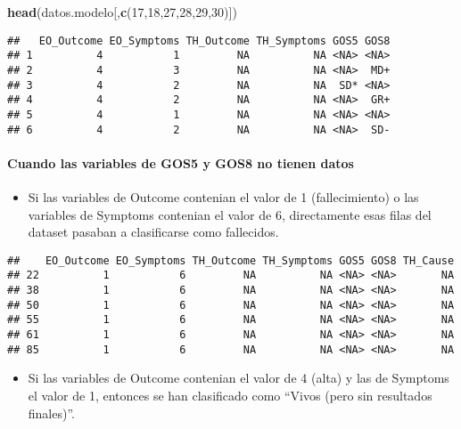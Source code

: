 \documentclass[]{article}
\newenvironment{Shaded}{\begin{snugshade}}{\end{snugshade}}
\newcommand{\KeywordTok}[1]{\textcolor[rgb]{0.13,0.29,0.53}{\textbf{#1}}}
\newcommand{\DecValTok}[1]{\textcolor[rgb]{0.00,0.00,0.81}{#1}}
\newcommand{\NormalTok}[1]{#1}
\providecommand{\tightlist}{%
  \setlength{\itemsep}{0pt}\setlength{\parskip}{0pt}}
\let\oldparagraph\paragraph
\renewcommand{\paragraph}[1]{\oldparagraph{#1}\mbox{}}
\begin{document}
\begin{Shaded}
\begin{Highlighting}[]
\KeywordTok{head}\NormalTok{(datos.modelo[,}\KeywordTok{c}\NormalTok{(}\DecValTok{17}\NormalTok{,}\DecValTok{18}\NormalTok{,}\DecValTok{27}\NormalTok{,}\DecValTok{28}\NormalTok{,}\DecValTok{29}\NormalTok{,}\DecValTok{30}\NormalTok{)])}
\end{Highlighting}
\end{Shaded}

\begin{verbatim}
##   EO_Outcome EO_Symptoms TH_Outcome TH_Symptoms GOS5 GOS8
## 1          4           1         NA          NA <NA> <NA>
## 2          4           3         NA          NA <NA>  MD+
## 3          4           2         NA          NA  SD* <NA>
## 4          4           2         NA          NA <NA>  GR+
## 5          4           1         NA          NA <NA> <NA>
## 6          4           2         NA          NA <NA>  SD-
\end{verbatim}

\paragraph{\texorpdfstring{Cuando las variables de GOS5 y GOS8
\textbf{no tienen}
datos}{Cuando las variables de GOS5 y GOS8 no tienen datos}}\label{cuando-las-variables-de-gos5-y-gos8-no-tienen-datos}

\begin{itemize}
\tightlist
\item
  Si las variables de Outcome contenian el valor de 1 (fallecimiento) o
  las variables de Symptoms contenian el valor de 6, directamente esas
  filas del dataset pasaban a clasificarse como fallecidos.
\end{itemize}

\begin{verbatim}
##    EO_Outcome EO_Symptoms TH_Outcome TH_Symptoms GOS5 GOS8 TH_Cause
## 22          1           6         NA          NA <NA> <NA>       NA
## 38          1           6         NA          NA <NA> <NA>       NA
## 50          1           6         NA          NA <NA> <NA>       NA
## 55          1           6         NA          NA <NA> <NA>       NA
## 61          1           6         NA          NA <NA> <NA>       NA
## 85          1           6         NA          NA <NA> <NA>       NA
\end{verbatim}

\begin{itemize}
\tightlist
\item
  Si las variables de Outcome contenian el valor de 4 (alta) y las de
  Symptoms el valor de 1, entonces se han clasificado como ``Vivos (pero
  sin resultados finales)''.
\end{itemize}
\end{document}

